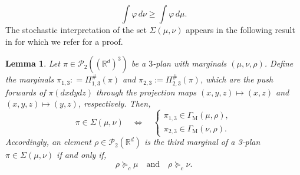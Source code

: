 \documentclass[11pt,reqno]{amsart}
\newtheorem{lemma}[theorem]{Lemma}
\theoremstyle{definition}
\numberwithin{equation}{section}
\newcommand{\R}{\mathbb{R}}
\newcommand{\Rd}{{\R^d}}
\newcommand{\PP}{\mathcal{P}}
\begin{document}
\begin{equation}\label{order}
\int \varphi\, d\nu \ge \int  \varphi\, d\mu .
 \end{equation}
The stochastic interpretation of the set $\Sigma(\mu,\nu)$ appears in the following result  in \cite[Lemma 3.3]{bolbou2024} for which we refer for a proof.
\begin{lemma}\label{Sigmamunu=Amunu} Let $\pi\in \PP_2((\Rd)^3)$ be a $3$-plan with marginals $(\mu,\nu,\rho)$. Define the marginals $\pi_{1,3} : =\Pi_{1,3}^\#(\pi)$ and $\pi_{2,3} :=\Pi_{2,3}^\#(\pi)$, which are the push forwards of $\pi(dxdydz)$ through the projection maps $(x,y,z)\mapsto (x,z)$ and $(x,y,z)\mapsto (y,z)$, respectively.  
Then,
\begin{equation}\label{equival}
\pi\in \Sigma(\mu,\nu) \quad \Leftrightarrow \quad  \begin{cases} \pi_{1,3} \in \Gamma_{\mathrm{M}}(\mu,\rho), \\
  \pi_{2,3} \in \Gamma_{\mathrm{M}}(\nu,\rho). \end{cases}
\end{equation}
Accordingly, an element $\rho\in\PP_2(\Rd)$ is the third marginal of a 3-plan $\pi \in \Sigma(\mu,\nu)$  if and only if,
\begin{equation}\label{rho-admi}
\rho  \succeq_c \mu \quad \text{and}\quad \rho  \succeq_c \nu .
 \end{equation}
\end{lemma}


 
 
\end{document}
